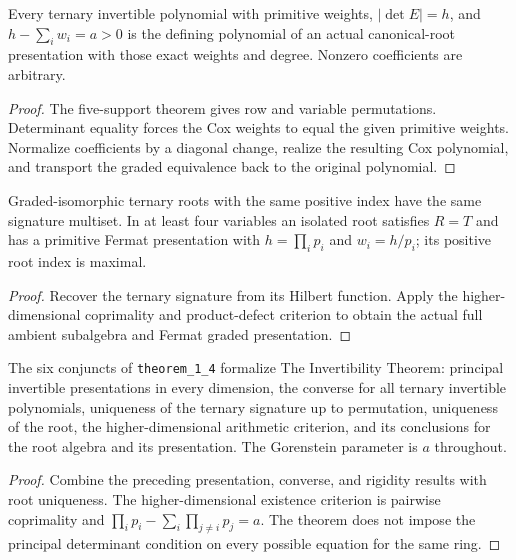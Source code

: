 \begin{theorem}
\label{thm:invertible-converse}
\leanok
Every ternary invertible polynomial with primitive weights, $|\det E|=h$, and $h-\sum_iw_i=a>0$ is the defining polynomial of an actual canonical-root presentation with those exact weights and degree. Nonzero coefficients are arbitrary.
\end{theorem}
\begin{proof}
\leanok
{}
The five-support theorem gives row and variable permutations. Determinant equality forces the Cox weights to equal the given primitive weights. Normalize coefficients by a diagonal change, realize the resulting Cox polynomial, and transport the graded equivalence back to the original polynomial.
\end{proof}

\begin{theorem}
\label{thm:manuscript-rigidity}
\leanok
Graded-isomorphic ternary roots with the same positive index have the same signature multiset. In at least four variables an isolated root satisfies $R=T$ and has a primitive Fermat presentation with $h=\prod_i p_i$ and $w_i=h/p_i$; its positive root index is maximal.
\end{theorem}
\begin{proof}
\leanok
{}
Recover the ternary signature from its Hilbert function. Apply the higher-dimensional coprimality and product-defect criterion to obtain the actual full ambient subalgebra and Fermat graded presentation.
\end{proof}

\begin{theorem}
\label{thm:one-four}
\leanok
The six conjuncts of \texttt{theorem\_1\_4} formalize The Invertibility Theorem: principal invertible presentations in every dimension, the converse for all ternary invertible polynomials, uniqueness of the ternary signature up to permutation, uniqueness of the root, the higher-dimensional arithmetic criterion, and its conclusions for the root algebra and its presentation. The Gorenstein parameter is $a$ throughout.
\end{theorem}
\begin{proof}
\leanok
{}
Combine the preceding presentation, converse, and rigidity results with root uniqueness. The higher-dimensional existence criterion is pairwise coprimality and $\prod_i p_i-\sum_i\prod_{j\ne i}p_j=a$. The theorem does not impose the principal determinant condition on every possible equation for the same ring.
\end{proof}

